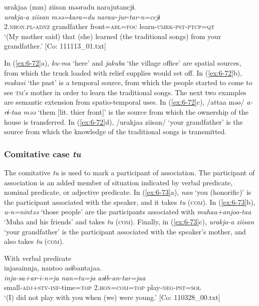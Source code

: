 \ex {\TM}  urakjaa  (mm)  ziisan  məəradu narajutancjɨ.\\
\glll \textit{urakja-a}    \textit{ziisan}  \textit{məə=kara=du}     \textit{naraw-jur-tar-n=ccjɨ}\\
2.\textsc{nhon}.\textsc{pl}-\textsc{adnz}    grandfather  front=\textsc{abl}=\textsc{foc}   learn-\textsc{umrk}-\textsc{pst}-\textsc{ptcp}=\textsc{qt}\\
\glt ‘(My mother said) that (she) learned (the traditional songs) from your grandfather.’ [Co: 111113\_01.txt]
\z

In (\ref{ex:6-72}a), \textit{ku-ma} ‘here’ and \textit{jakuba} ‘the village office’ are spatial sources, from which the truck loaded with relief supplies would set off. In (\ref{ex:6-72}b), \textit{mukasi} ‘the past’ is a temporal source, from which the people started to come to see \textsc{tm}’s mother in order to learn the traditional songs. The next two examples are semantic extension from spatio-temporal uses. In (\ref{ex:6-72}c), /attaa məə/ \textit{a-rɨ-taa} \textit{məə} ‘them [lit. thier front]’ is the source from which the ownership of the house is transferred. In (\ref{ex:6-72}d), /urakjaa ziisan/ ‘your grandfather’ is the source from which the knowledge of the traditional songs is transmitted.

\subsubsection{ Comitative case \textit{tu}}

The comitative \textit{tu} is used to mark a participant of association. The participant of association is an added member of situation indicated by verbal predicate, nominal predicate, or adjective predicate. In (\ref{ex:6-73}a), \textit{nan} ‘you (honorific)’ is the participant associated with the speaker, and it takes \textit{tu} (\textsc{com}). In (\ref{ex:6-73}b), \textit{u-n=nintəə} ‘those people’ are the participants associated with \textit{muhaa+anjoo-taa} ‘Muha and his friends’ and takes \textit{tu} (\textsc{com}). Finally, in (\ref{ex:6-73}c), \textit{urakja-a} \textit{ziisan} ‘your grandfather’ is the participant associated with the speaker’s mother, and also takes \textit{tu} (\textsc{com}).

\ea\label{ex:6-73}
\ea With verbal predicate\\
{\TM}
\glll  injasainnja,  nantoo  asɨbantajaa.\\
\textit{inja-sa+ar-i-n=ja}  \textit{nan=tu=ja}  \textit{asɨb-an-tar=jaa}\\
small-\textsc{adj}+\textsc{stv}-\textsc{inf}-time=\textsc{top}  2.\textsc{hon}=\textsc{com}=\textsc{top}  play-\textsc{neg}-\textsc{pst}=\textsc{sol}\\
\glt ‘(I) did not play with you when (we) were young.’ [Co: 110328\_00.txt]
\z

